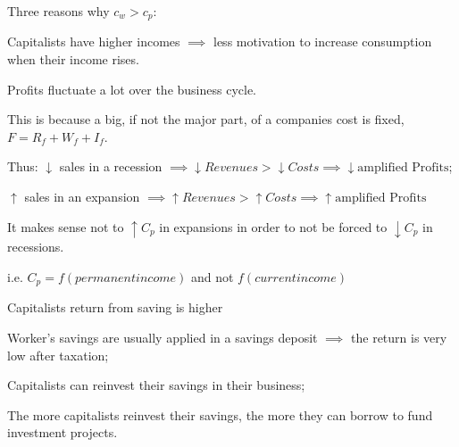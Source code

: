 \documentclass{report}
\begin{document}
Three reasons why $c_w>c_p$: 
\begin{enumerate}
    \item Capitalists have higher incomes $\implies$ less motivation to increase consumption when their income rises. 
    \item Profits fluctuate a lot over the business cycle.
    \begin{description}
        \item This is because a big, if not the major part, of a companies cost is fixed, $F=R_f+W_f+I_f$. 
        \begin{description}
            \item Thus: $\downarrow$ sales in a recession $\implies \downarrow Revenues > \downarrow Costs \implies \downarrow \text{amplified Profits}$; 
            \item $\uparrow$ sales in an expansion $\implies \uparrow Revenues>\uparrow Costs \implies \uparrow \text{amplified Profits}$
            \item It makes sense not to $\uparrow C_p$ in expansions in order to not be forced to $\downarrow C_p$ in recessions.
            \item i.e. $C_p=f(permanent income)$ and not $f(current income)$
        \end{description}
    \end{description}
    \item Capitalists return from saving is higher
    \begin{description}
        \item Worker's savings are usually applied in a savings deposit $\implies$ the return is very low after taxation; 
        \item Capitalists can reinvest their savings in their business; 
        \item The more capitalists reinvest their savings, the more they can borrow to fund investment projects.
    \end{description}
\end{enumerate}
\end{document}
